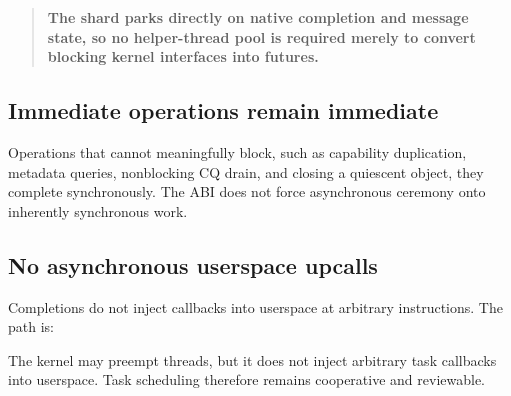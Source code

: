 \begin{quote}
\textbf{The shard parks directly on native completion and message state, so no
helper-thread pool is required merely to convert blocking kernel interfaces
into futures.}
\end{quote}

\subsection{Immediate operations remain immediate}

Operations that cannot meaningfully block, such as capability duplication,
metadata queries, nonblocking CQ drain, and closing a quiescent object, they
complete synchronously. The ABI does not force asynchronous ceremony onto inherently
synchronous work.

\subsection{No asynchronous userspace upcalls}

Completions do not inject callbacks into userspace at arbitrary instructions. The
path is:

\begin{center}
\end{center}

The kernel may preempt threads, but it does not inject arbitrary task callbacks
into userspace. Task scheduling therefore remains cooperative and reviewable.

